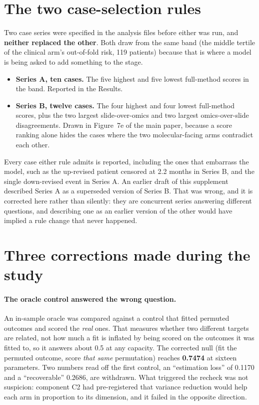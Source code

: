 \documentclass[11pt]{article}
\begin{document}
\section{The two case-selection rules}

Two case series were specified in the analysis files before either was run, and \textbf{neither
replaced the other}. Both draw from the same band (the middle tertile of the clinical arm's out-of-fold risk, 119 patients) because that is where a model is being asked to add something to
the stage.

\begin{itemize}
  \item \textbf{Series A, ten cases.} The five highest and five lowest full-method scores in the
    band. Reported in the Results.
  \item \textbf{Series B, twelve cases.} The four highest and four lowest full-method scores, plus
    the two largest slide-over-omics and two largest omics-over-slide disagreements. Drawn in
    Figure~7e of the main paper, because a score ranking alone hides the cases where the two
    molecular-facing arms contradict each other.
\end{itemize}

Every case either rule admits is reported, including the ones that embarrass the model, such as the up-revised
patient censored at 2.2 months in Series B, and the single down-revised event in
Series A. An earlier draft of this supplement described Series A as a superseded version of
Series B. That was wrong, and it is corrected here rather than silently: they are concurrent series
answering different questions, and describing one as an earlier version of the other would have
implied a rule change that never happened.


\section{Three corrections made during the study}
\paragraph{The oracle control answered the wrong question.} An in-sample oracle was compared against
a control that fitted permuted outcomes and scored the \emph{real} ones. That measures whether two
different targets are related, not how much a fit is inflated by being scored on the outcomes it was
fitted to, so it answers about 0.5 at any capacity. The corrected null (fit the permuted outcome, score \emph{that same} permutation) reaches \textbf{0.7474} at sixteen parameters. Two numbers
read off the first control, an ``estimation loss'' of 0.1170 and a ``recoverable'' 0.2686, are
withdrawn. What triggered the recheck was not suspicion: component C2 had pre-registered that
variance reduction would help each arm in proportion to its dimension, and it failed in the opposite
direction.
\end{document}
